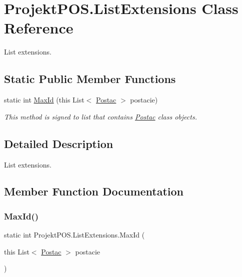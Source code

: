 \hypertarget{class_projekt_p_o_s_1_1_list_extensions}{}\section{Projekt\+P\+O\+S.\+List\+Extensions Class Reference}
\label{class_projekt_p_o_s_1_1_list_extensions}


List extensions.  


\subsection*{Static Public Member Functions}
\begin{DoxyCompactItemize}
\item 
static int \hyperlink{class_projekt_p_o_s_1_1_list_extensions_aaec21e8ac3689f1e2b9ebccf8eadd64a}{Max\+Id} (this List$<$ \hyperlink{class_projekt_p_o_s_1_1_postac}{Postac} $>$ postacie)
\begin{DoxyCompactList}\small\item\em This method is signed to list that contains \hyperlink{class_projekt_p_o_s_1_1_postac}{Postac} class objects. \end{DoxyCompactList}\end{DoxyCompactItemize}


\subsection{Detailed Description}
List extensions. 



\subsection{Member Function Documentation}
\mbox{\label{class_projekt_p_o_s_1_1_list_extensions_aaec21e8ac3689f1e2b9ebccf8eadd64a}} 
\subsubsection{\texorpdfstring{Max\+Id()}{MaxId()}}
{\footnotesize\ttfamily static int Projekt\+P\+O\+S.\+List\+Extensions.\+Max\+Id (\begin{DoxyParamCaption}\item[{this List$<$ \hyperlink{class_projekt_p_o_s_1_1_postac}{Postac} $>$}]{postacie }\end{DoxyParamCaption})\hspace{0.3cm}{\ttfamily [static]}}



